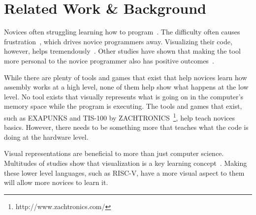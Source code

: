 


\section{Related Work \& Background}

Novices often struggling learning how to program~\cite{teague2008collaborative}.
%
The difficulty often causes frustration~\cite{ihantola2010review}, which drives novice programmers away.
%
Visualizing their code, however, helps tremendously~\cite{rodrigo2009affective, smith2000programming}.
%
Other studies have shown that making the tool more personal to the novice programmer also has positive outcomes~\cite{lee2011personifying, soflano2015application}.
%


While there are plenty of tools and games that exist that help novices learn how assembly works at a high level, none of them help show what happens at the low level.
%
No tool exists that visually represents what is going on in the computer's memory space while the program is executing.
%
The tools and games that exist, such as EXAPUNKS and TIS-100 by ZACHTRONICS~\footnote{http://www.zachtronics.com/}, help teach novices basics.
%
However, there needs to be something more that teaches what the code is doing at the hardware level.



Visual representations are beneficial to more than just computer science.
%
Multitudes of studies show that visualization is a key learning concept~\cite{beeland2002student, lowe1999extracting, mayer2003three}.
%
Making these lower level languages, such as RISC-V, have a more visual aspect to them will allow more novices to learn it.
